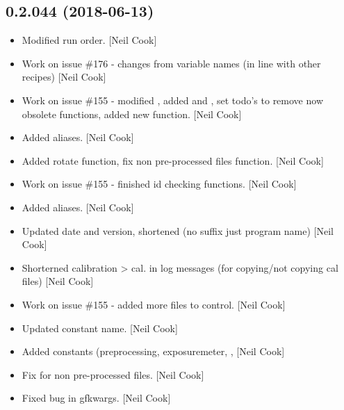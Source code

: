 \documentclass[a4paper,10pt,english]{report}
\begin{document}
\subsection{0.2.044 (2018-06-13)}
\label{\detokenize{misc/changelog:id422}}\begin{itemize}
\item {} 
Modified run order. {[}Neil Cook{]}

\item {} 
Work on issue \#176 - changes from variable names (in line with other
recipes) {[}Neil Cook{]}

\item {} 
Work on issue \#155 - modified , added
 and , set todo’s to remove now
obsolete functions, added new  function. {[}Neil Cook{]}

\item {} 
Added aliases. {[}Neil Cook{]}

\item {} 
Added rotate function, fix non pre-processed files function. {[}Neil
Cook{]}

\item {} 
Work on issue \#155 - finished id checking functions. {[}Neil Cook{]}

\item {} 
Added aliases. {[}Neil Cook{]}

\item {} 
Updated date and version, shortened  (no suffix just program
name) {[}Neil Cook{]}

\item {} 
Shorterned calibration \textendash{}\textgreater{} cal. in log messages (for copying/not
copying cal files) {[}Neil Cook{]}

\item {} 
Work on issue \#155 - added more files to control. {[}Neil Cook{]}

\item {} 
Updated constant name. {[}Neil Cook{]}

\item {} 
Added constants (preprocessing, exposuremeter, ,  {[}Neil
Cook{]}

\item {} 
Fix for non pre-processed files. {[}Neil Cook{]}

\item {} 
Fixed bug in gfkwargs. {[}Neil Cook{]}


\end{itemize}
\end{document}
